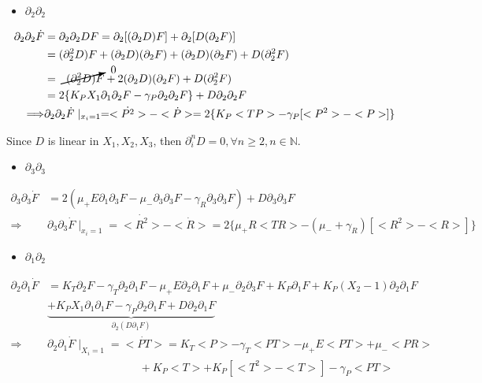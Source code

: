 \documentclass{article}
\begin{document}
\begin{itemize}
    \item $\partial_2\partial_2$
\end{itemize}
\begin{align*}
    \partial_2\partial_2\Dot{F} &= \partial_2\partial_2DF = \partial_2[(\partial_2D)F] + \partial_2[D(\partial_2F)]\\
                                &= (\partial_2^2D)F + (\partial_2D)(\partial_2F) + (\partial_2D)(\partial_2F) + D(\partial_2^2F)\\
                                &= \cancelto{0}{(\partial_2^2D)F} + 2(\partial_2D)(\partial_2F) + D(\partial_2^2F)\\
                                &= 2\{K_PX_1\partial_1\partial_2F - \gamma_P\partial_2\partial_2F\} + D\partial_2\partial_2F\\
            \Longrightarrow     & \partial_2\partial_2\Dot{F}\mid_{x_i=1} = <\Dot{P^2}> - <\Dot{P}> = 2\{K_P<TP> - \gamma_P[<P^2> - <P>]\}
\end{align*}

Since $D$ is linear in $X_1, X_2, X_3$, then $\partial_i^nD=0, \forall n \ge 2, n \in \mathbb{N}$.

\begin{itemize}
    \item $\partial_3\partial_3$
\end{itemize}
\begin{align*}
    \partial_3\partial_3\Dot{F} &= 2( \mu_+E\partial_1\partial_3F - \mu_-\partial_3\partial_3F - \gamma_R\partial_3\partial_3F) + D\partial_3\partial_3F\\
            \Longrightarrow     & \partial_3\partial_3\Dot{F}\mid_{x_i=1} = <\Dot{R^2}> - <\Dot{R}> = 2\{\mu_+R<TR> - (\mu_- + \gamma_R)[<R^2> - <R>]\}
\end{align*}

\begin{itemize}
    \item $\partial_1\partial_2$
\end{itemize}
\begin{align*}
    \partial_2\partial_1\Dot{F} &= K_T\partial_2F - \gamma_T\partial_2\partial_1F - \mu_+E\partial_2\partial_1F + \mu_-\partial_2\partial_3F + K_P\partial_1F + K_P(X_2 - 1)\partial_2\partial_1F  \\
                                &\underbrace{+ K_PX_1\partial_1\partial_1F - \gamma_P\partial_2\partial_1F + D\partial_2\partial_1F}_{\partial_2(D\partial_1F)}\\
    \Longrightarrow & \partial_2\partial_1\Dot{F}\mid_{X_i=1} = <\Dot{PT}> = K_T<P> - \gamma_T<PT> -\mu_+E<PT> + \mu_-<PR>\\
                    & \hspace{100pt}  + K_P<T> + K_P[<T^2> - <T>] - \gamma_P<PT>
\end{align*}
\end{document}

